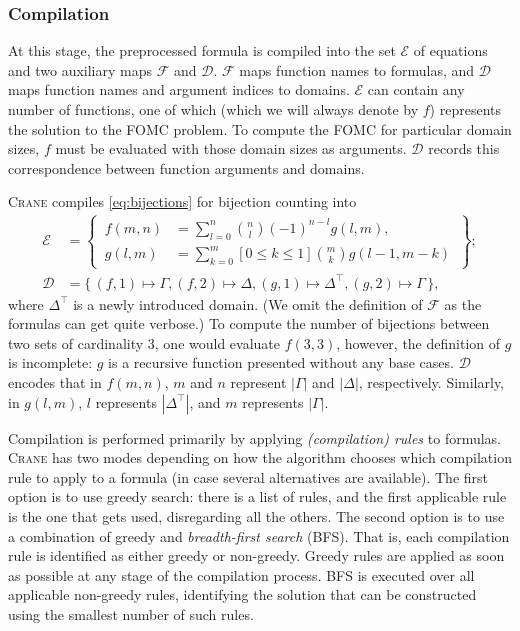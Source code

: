 \documentclass[a4paper,UKenglish,cleveref, autoref, thm-restate]{lipics-v2021}
\begin{document}
\subsubsection{Compilation}\label{sec:compilation}

At this stage, the preprocessed formula is compiled into the set $\mathcal{E}$
of equations and two auxiliary maps $\mathcal{F}$ and $\mathcal{D}$.
$\mathcal{F}$ maps function names to formulas, and $\mathcal{D}$ maps function
names and argument indices to domains. $\mathcal{E}$ can contain any number of
functions, one of which (which we will always denote by $f$) represents the
solution to the FOMC problem. To compute the FOMC for particular domain sizes,
$f$ must be evaluated with those domain sizes as arguments. $\mathcal{D}$
records this correspondence between function arguments and domains.

\begin{example}\label{example:solution}
  \textsc{Crane} compiles \cref{eq:bijections} for bijection counting into
  \begin{align*}
    \mathcal{E} &= \left\{\,\begin{aligned}f(m, n) &= \sum_{l=0}^{n} \binom{n}{l}{(-1)}^{n-l}g(l, m),\\ g(l, m) &= \sum_{k=0}^{m}[0 \le k \le 1]\binom{m}{k}g(l-1, m-k)\end{aligned}\,\right\};\\
    \mathcal{D} &= \{\, (f, 1) \mapsto \Gamma, (f, 2) \mapsto \Delta, (g, 1) \mapsto \Delta^{\top}, (g, 2) \mapsto \Gamma \,\},
  \end{align*}
  where $\Delta^{\top}$ is a newly introduced domain. (We omit the definition of
  $\mathcal{F}$ as the formulas can get quite verbose.) To compute the number of
  bijections between two sets of cardinality 3, one would evaluate $f(3, 3)$,
  however, the definition of $g$ is incomplete: $g$ is a recursive function
  presented without any base cases. $\mathcal{D}$ encodes that in $f(m, n)$, $m$
  and $n$ represent $|\Gamma|$ and $|\Delta|$, respectively. Similarly, in
  $g(l, m)$, $l$ represents $|\Delta^{\top}|$, and $m$ represents $|\Gamma|$.
\end{example}

Compilation is performed primarily by applying \emph{(compilation) rules} to
formulas. \textsc{Crane} has two modes depending on how the algorithm chooses
which compilation rule to apply to a formula (in case several alternatives are
available). The first option is to use greedy search: there is a list of rules,
and the first applicable rule is the one that gets used, disregarding all the
others. The second option is to use a combination of greedy and
\emph{breadth-first search} (BFS). That is, each compilation rule is identified
as either greedy or non-greedy. Greedy rules are applied as soon as possible at
any stage of the compilation process. BFS is executed over all applicable
non-greedy rules, identifying the solution that can be constructed using the
smallest number of such rules.
\end{document}
